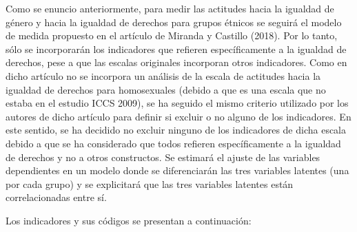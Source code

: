 \documentclass[12pt,twoside]{templates/facsothesis}
\begin{document}
Como se enuncio anteriormente, para medir las actitudes hacia la igualdad de género y hacia la igualdad de derechos para grupos étnicos se seguirá el modelo de medida propuesto en el artículo de Miranda y Castillo (2018). Por lo tanto, sólo se incorporarán los indicadores que refieren específicamente a la igualdad de derechos, pese a que las escalas originales incorporan otros indicadores. Como en dicho artículo no se incorpora un análisis de la escala de actitudes hacia la igualdad de derechos para homosexuales (debido a que es una escala que no estaba en el estudio ICCS 2009), se ha seguido el mismo criterio utilizado por los autores de dicho artículo para definir si excluir o no alguno de los indicadores. En este sentido, se ha decidido no excluir ninguno de los indicadores de dicha escala debido a que se ha considerado que todos refieren específicamente a la igualdad de derechos y no a otros constructos. Se estimará el ajuste de las variables dependientes en un modelo donde se diferenciarán las tres variables latentes (una por cada grupo) y se explicitará que las tres variables latentes están correlacionadas entre sí.

Los indicadores y sus códigos se presentan a continuación:
\end{document}
